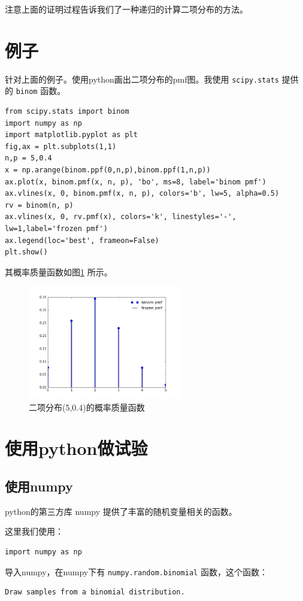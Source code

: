\documentclass[10pt,a4paper,UTF8]{article}
\begin{document}
注意上面的证明过程告诉我们了一种递归的计算二项分布的方法。

\section{例子}
\label{sec:org50b5512}


针对上面的例子。使用python画出二项分布的pmf图。我使用 \texttt{scipy.stats} 提供的 \texttt{binom} 函数。
\lstset{language=Python,label= ,caption= ,captionpos=b,numbers=none}
\begin{lstlisting}
from scipy.stats import binom
import numpy as np
import matplotlib.pyplot as plt
fig,ax = plt.subplots(1,1)
n,p = 5,0.4
x = np.arange(binom.ppf(0,n,p),binom.ppf(1,n,p))
ax.plot(x, binom.pmf(x, n, p), 'bo', ms=8, label='binom pmf')
ax.vlines(x, 0, binom.pmf(x, n, p), colors='b', lw=5, alpha=0.5)
rv = binom(n, p)
ax.vlines(x, 0, rv.pmf(x), colors='k', linestyles='-', lw=1,label='frozen pmf')
ax.legend(loc='best', frameon=False)
plt.show()
\end{lstlisting}

其概率质量函数如图\ref{fig:org66d6bb2} 所示。
\begin{figure}[htbp]
\centering
\includegraphics[width=0.6\textwidth]{../../img/math_probability/20160605binomDistribution.png}
\caption{\label{fig:org66d6bb2}
二项分布(5,0.4)的概率质量函数}
\end{figure}
\section{使用python做试验}
\label{sec:org9d8ed21}
\subsection{使用numpy}
\label{sec:orgd65fb9d}


python的第三方库 numpy 提供了丰富的随机变量相关的函数。

这里我们使用：
\lstset{language=Python,label= ,caption= ,captionpos=b,numbers=none}
\begin{lstlisting}
import numpy as np
\end{lstlisting}
导入numpy，在numpy下有 \texttt{numpy.random.binomial} 函数，这个函数：
\begin{verbatim}
Draw samples from a binomial distribution.
\end{verbatim}
\end{document}
